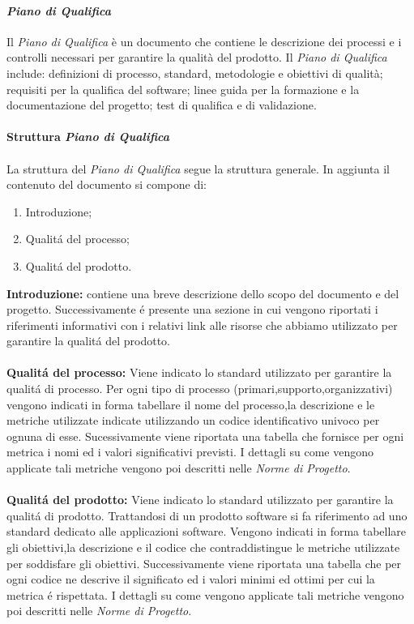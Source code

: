 \paragraph{\textit{Piano di Qualifica}}
Il \textit{Piano di Qualifica} è un documento che contiene le descrizione dei processi e i controlli necessari per garantire la qualità del prodotto. 
Il \textit{Piano di Qualifica} include: definizioni di processo, standard, metodologie e obiettivi di qualità; requisiti per la 
qualifica del software; linee guida per la formazione e la documentazione del progetto; test di qualifica e di validazione.
\\\\
\textbf{Struttura \textit{Piano di Qualifica}}
\\\\
La struttura del \textit{Piano di Qualifica} segue la struttura generale.
In aggiunta il contenuto del documento si compone di:
\begin{enumerate}
    \item Introduzione;
    \item Qualitá del processo;
    \item Qualitá del prodotto.
\end{enumerate}
\textbf{Introduzione:} contiene una breve descrizione dello scopo del documento e del progetto.
Successivamente é presente una sezione in cui vengono riportati i riferimenti informativi 
con i relativi link alle risorse che abbiamo utilizzato per garantire la qualitá del prodotto.
\\\\
\textbf{Qualitá del processo:} Viene indicato lo standard utilizzato per garantire la qualitá di processo.
Per ogni tipo di processo (primari,supporto,organizzativi) vengono indicati in forma tabellare il nome del processo,la descrizione e le metriche utilizzate
indicate utilizzando un codice identificativo univoco per ognuna di esse.
Sucessivamente viene riportata una tabella che fornisce per ogni metrica i nomi ed i valori significativi previsti.
I dettagli su come vengono applicate tali metriche vengono poi descritti nelle \textit{Norme di Progetto}.
\\\\
\textbf{Qualitá del prodotto:} Viene indicato lo standard utilizzato per garantire la qualitá di prodotto.
Trattandosi di un prodotto software si fa riferimento ad uno standard dedicato alle applicazioni software.
Vengono indicati in forma tabellare gli obiettivi,la descrizione e il codice che contraddistingue le metriche utilizzate per soddisfare gli obiettivi.
Successivamente viene riportata una tabella che per ogni codice ne descrive il significato ed i valori minimi ed ottimi per cui la metrica é rispettata.
I dettagli su come vengono applicate tali metriche vengono poi descritti nelle \textit{Norme di Progetto}.